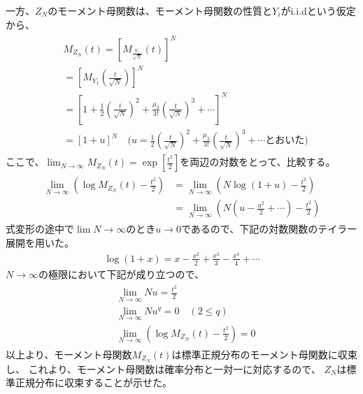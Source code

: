 \documentclass[a4j]{jarticle}
\begin{document}
一方、$Z_N$のモーメント母関数は、モーメント母関数の性質と$Y_{i}$がi.i.dという仮定から、
\begin{align}
    \begin{aligned}
    &M_{Z_{N}}(t)=[M_{\frac{Y_{1}}{\sqrt{N}}}(t)]^N \\
    &=[M_{Y_{1}}(\frac{t}{\sqrt{N}})]^N \\
    &=[1+\frac{1}{2}(\frac{t}{\sqrt{N}})^2+\frac{\mu_{3}}{3!}(\frac{t}{\sqrt{N}})^3+\cdots]^N \\ 
    &=[1+u]^N \quad \text{($u=\frac{1}{2}(\frac{t}{\sqrt{N}})^2+\frac{\mu_{3}}{3!}(\frac{t}{\sqrt{N}})^3+\cdots$とおいた)}
    \end{aligned} 
\end{align}
ここで、$\lim_{N \to \infty}M_{Z_{N}}(t)=\exp[\frac{t^2}{2}]$を両辺の対数をとって、比較する。
\begin{align}
    \begin{aligned}
    \lim_{N \to \infty}(\log{M_{Z_{N}}(t)}-\frac{t^2}{2})
    &=\lim_{N \to \infty}(N\log(1+u)-\frac{t^2}{2}) \\
    &=\lim_{N \to \infty}(N(u-\frac{u^2}{2}+\cdots)-\frac{t^2}{2})
    \end{aligned} 
\end{align}
式変形の途中で$\lim{N \to \infty}$のとき$u \to 0$であるので、下記の対数関数のテイラー展開を用いた。
\begin{align}
    \log(1+x)=x-\frac{x^2}{2}+\frac{x^3}{3}-\frac{x^4}{4}+\cdots
\end{align}
$N \to \infty$の極限において下記が成り立つので、
\begin{align}
    \begin{aligned}
    &\lim_{N \to \infty}Nu=\frac{t^2}{2} \\
    &\lim_{N \to \infty}Nu^{q}=0 \quad (2 \leq q) \\
    &\lim_{N \to \infty}(\log{M_{Z_{N}}(t)}-\frac{t^2}{2})=0
    \end{aligned} 
\end{align}
以上より、モーメント母関数$M_{Z_{N}}(t)$は標準正規分布のモーメント母関数に収束し、
これより、モーメント母関数は確率分布と一対一に対応するので、
$Z_{N}$は標準正規分布に収束することが示せた。
\end{document}

